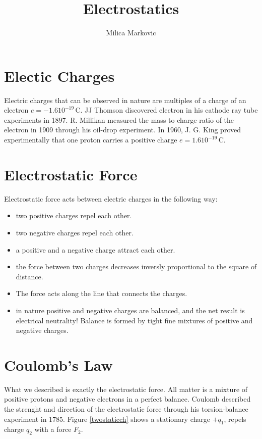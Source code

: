 \documentclass{ximera}
\title{Electrostatics}
\author{Milica Markovic}
\begin{document}
  
\begin{abstract}  

\end{abstract}  
\maketitle    



\section{Electic Charges}
 Electric charges that can be observed in nature are multiples of a charge of an electron $e=-1.6 10^{-19}$\,C. JJ Thomson discovered electron in his cathode ray tube experiments in  1897. R. Millikan measured the mass to charge ratio of the electron in 1909 through his oil-drop experiment.  In 1960, J. G. King proved experimentally that one proton carries a positive charge $e=1.6 10^{-19}$\,C. 

\section{Electrostatic Force}

Electrostatic force acts between electric charges in the following way:

\begin{itemize}
\item two positive charges repel each other.
\item two negative charges repel each other.
\item a positive and a negative charge attract each other.
\item the force between two charges decreases inversly proportional to the square of distance.
\item The force acts along the line that connects the charges.
\item in nature positive and negative charges are balanced, and the net result is electrical neutrality! Balance is formed by tight fine mixtures of positive and negative charges.
\end{itemize}
 
 
 \section{Coulomb's Law}

What we described is exactly the electrostatic force. All matter is a mixture of positive protons and negative electrons in a perfect balance. Coulomb described the strenght and direction of the electrostatic force through his torsion-balance experiment in 1785. Figure \ref{twostaticch} shows a stationary charge $+q_1$, repels charge $q_2$ with a force $F_{2}$.
\end{document}
